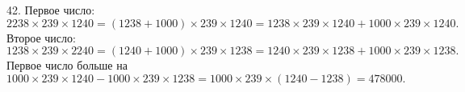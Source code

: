 42. Первое число: $2238\times239\times1240=(1238+1000)\times239\times1240=
1238\times239\times1240+1000\times239\times1240.$ Второе число:
$1238\times239\times2240=(1240+1000)\times239\times1238=1240\times239\times1238+
1000\times239\times1238.$ Первое число больше на $1000\times239\times1240-1000\times239\times1238=1000\times239\times(1240-1238)=478000.$\\
